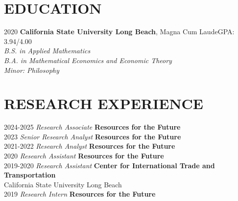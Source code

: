 \documentclass[margin]{res}
\begin{document}
\begin{resume}

\section{EDUCATION}

2020 \hspace*{10mm}%
\textbf{California State University Long Beach}, Magna Cum Laude\hfill{GPA: 3.94/4.00} \\
\textit{
\hspace*{18mm}%
B.S. in Applied Mathematics  \\ 
\hspace*{18mm}%
B.A. in Mathematical Economics and Economic Theory \\
\hspace*{18mm}%
Minor: Philosophy}



\section{RESEARCH EXPERIENCE}
2024-2025 \hspace*{2mm} \textit{Research Associate} \hfill{\textbf{Resources for the Future}} \\
2023 \hspace*{10mm} \textit{Senior Research Analyst} \hfill{\textbf{Resources for the Future}} \\
2021-2022 \hspace*{2mm} \textit{Research Analyst} \hfill{\textbf{Resources for the Future}} \\
2020 \hspace*{10mm} \textit{Research Assistant} \hfill{\textbf{Resources for the Future}}\\
2019-2020 \hspace*{2mm} \textit{Research Assistant} \hfill{\textbf{Center for International Trade and Transportation}} \\
\hspace*{1mm} \hfill{California State University Long Beach} \\
2019 \hspace*{10mm} \textit{Research Intern} \hfill{\textbf{Resources for the Future}}


\end{resume}
\end{document}
